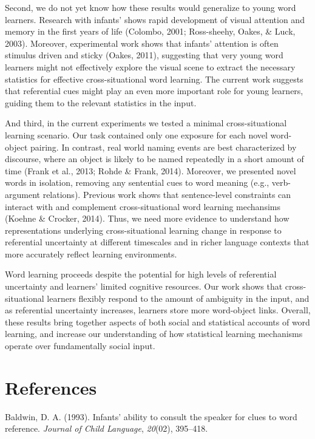 \documentclass[a4paper,man,natbib]{apa6}
\begin{document}
Second, we do not yet know how these results would generalize to young
word learners. Research with infants' shows rapid development of visual
attention and memory in the first years of life (Colombo, 2001;
Ross-sheehy, Oakes, \& Luck, 2003). Moreover, experimental work shows
that infants' attention is often stimulus driven and sticky (Oakes,
2011), suggesting that very young word learners might not effectively
explore the visual scene to extract the necessary statistics for
effective cross-situational word learning. The current work suggests
that referential cues might play an even more important role for young
learners, guiding them to the relevant statistics in the input.

And third, in the current experiments we tested a minimal
cross-situational learning scenario. Our task contained only one
exposure for each novel word-object pairing. In contrast, real world
naming events are best characterized by discourse, where an object is
likely to be named repeatedly in a short amount of time (Frank et al.,
2013; Rohde \& Frank, 2014). Moreover, we presented novel words in
isolation, removing any sentential cues to word meaning (e.g.,
verb-argument relations). Previous work shows that sentence-level
constraints can interact with and complement cross-situational word
learning mechansims (Koehne \& Crocker, 2014). Thus, we need more
evidence to understand how representations underlying cross-situational
learning change in response to referential uncertainty at different
timescales and in richer language contexts that more accurately reflect
learning environments.

Word learning proceeds despite the potential for high levels of
referential uncertainty and learners' limited cognitive resources. Our
work shows that cross-situational learners flexibly respond to the
amount of ambiguity in the input, and as referential uncertainty
increases, learners store more word-object links. Overall, these results
bring together aspects of both social and statistical accounts of word
learning, and increase our understanding of how statistical learning
mechanisms operate over fundamentally social input.

\newpage

\section*{References}\label{references}

Baldwin, D. A. (1993). Infants' ability to consult the speaker for clues
to word reference. \emph{Journal of Child Language}, \emph{20}(02),
395--418.
\end{document}
